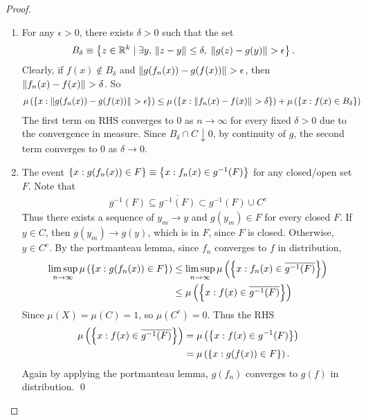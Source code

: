 \documentclass[11pt]{article}
\begin{document}
\begin{itemize}
\begin{proof}
\begin{enumerate}
\item For any $\epsilon>0$, there exists $\delta>0$ such that the set 
\begin{align*}
B_{\delta}&\equiv\left\{z\in {\mathbb R}^{k}\;|\; \exists y,\, \left\|z- y\right\|_{}\le \delta,\; \left\|g(z)-  g(y)\right\|_{} > \epsilon \right\}.
\end{align*}
Clearly, if $f(x)\not\in B_{\delta}$ and $\left\|g(f_{n}(x))- g(f(x))\right\|_{}>\epsilon$, then $\left\|f_{n}(x)- f(x)\right\|_{}>\delta$. So
\begin{align*}
\mu\left(\left\{x: \left\|g(f_{n}(x))- g(f(x))\right\|_{}>\epsilon \right\}\right)&\le \mu\left(\left\{x: \left\|f_{n}(x)- f(x)\right\|_{}>\delta\right\}\right)+ \mu\left(\left\{x: f(x)\in B_{\delta}\right\}\right)
\end{align*}
The first term on RHS converges to $0$ as $n\rightarrow \infty$ for every fixed $\delta>0$ due to the convergence in measure. Since $B_{\delta}\cap C \downarrow 0$, by continuity of $g$, the second term converges to $0$ as $\delta\rightarrow 0$.

\item The event $\left\{x: g(f_{n}(x))\in F\right\} \equiv \left\{x: f_{n}(x)\in g^{-1}(F)\right\}$ for any closed/open set $F$. Note that
\begin{align*}
g^{-1}(F) \subseteq \overline{g^{-1}(F)} \subset g^{-1}(F)\cup C^{c}
\end{align*}
Thus there exists a sequence of $y_{m}\rightarrow y$ and $g(y_{m})\in F$ for every closed $F$. If $y\in C$, then $g(y_{m})\rightarrow g(y)$, which is in $F$, since $F$ is closed. Otherwise, $y\in C^{c}$. By the portmanteau lemma, since $f_{n}$ converges to $f$ in distribution, 
\begin{align*}
\limsup\limits_{n\rightarrow \infty}\mu\left(\left\{x: g(f_{n}(x)) \in F  \right\}\right) &\le\limsup\limits_{n\rightarrow \infty} \mu\left(\left\{x: f_{n}(x) \in \overline{g^{-1}(F)}  \right\}\right)\\
& \le  \mu\left(\left\{x: f(x) \in \overline{g^{-1}(F)}  \right\}\right)
\end{align*}
Since $\mu(X)= \mu(C) =1$, so $\mu(C^{c})=0$. Thus the RHS
\begin{align*}
\mu\left(\left\{x: f(x) \in \overline{g^{-1}(F)}  \right\}\right) &=  \mu\left(\left\{x: f(x) \in g^{-1}(F)  \right\}\right)\\
&=  \mu\left(\left\{x: g(f(x)) \in F  \right\}\right).
\end{align*} Again by applying the portmanteau lemma, $g(f_{n})$ converges to $g(f)$ in distribution. \qed\\
\end{enumerate}
\end{proof}
\end{itemize}
\newpage


\end{document}
